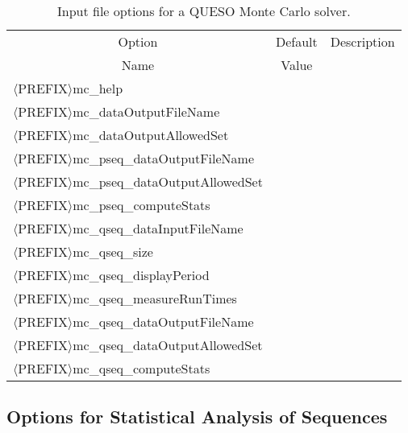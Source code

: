 \begin{table}[!h]
\begin{center}
\begin{tabular}{|l|c|c|}
\hline
\multicolumn{1}{|c|}{Option}                            & Default & Description \\
\multicolumn{1}{|c|}{Name}                              & Value   &             \\
\hline
\hline
$\langle$PREFIX$\rangle$mc\_help                        &         &             \\
\hline
$\langle$PREFIX$\rangle$mc\_dataOutputFileName          &         &             \\
\hline
$\langle$PREFIX$\rangle$mc\_dataOutputAllowedSet        &         &             \\
\hline
$\langle$PREFIX$\rangle$mc\_pseq\_dataOutputFileName     &         &             \\
\hline
$\langle$PREFIX$\rangle$mc\_pseq\_dataOutputAllowedSet   &         &             \\
\hline
$\langle$PREFIX$\rangle$mc\_pseq\_computeStats           &         &             \\
\hline
$\langle$PREFIX$\rangle$mc\_qseq\_dataInputFileName      &         &             \\
\hline
$\langle$PREFIX$\rangle$mc\_qseq\_size                   &         &             \\
\hline
$\langle$PREFIX$\rangle$mc\_qseq\_displayPeriod          &         &             \\
\hline
$\langle$PREFIX$\rangle$mc\_qseq\_measureRunTimes        &         &             \\
\hline
$\langle$PREFIX$\rangle$mc\_qseq\_dataOutputFileName     &         &             \\
\hline
$\langle$PREFIX$\rangle$mc\_qseq\_dataOutputAllowedSet   &         &             \\
\hline
$\langle$PREFIX$\rangle$mc\_qseq\_computeStats           &         &             \\
\hline
\end{tabular}
\end{center}
\caption{
Input file options for a QUESO Monte Carlo solver.
}
\label{tab-monte-carlo-options}
\end{table}

\subsection{Options for Statistical Analysis of Sequences}

